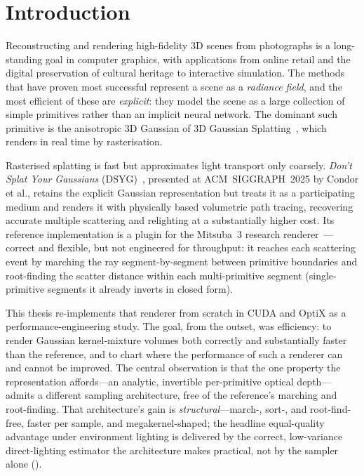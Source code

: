 \chapter{Introduction}

Reconstructing and rendering high-fidelity 3D scenes from photographs is a long-standing goal in
computer graphics, with applications from online retail and the digital preservation of cultural
heritage to interactive simulation. The methods that have proven most successful represent a scene as a
\emph{radiance field}, and the most efficient of these are \emph{explicit}: they model the scene as a
large collection of simple primitives rather than an implicit neural network. The dominant such
primitive is the anisotropic 3D Gaussian of 3D Gaussian Splatting~\cite{3DGS}, which renders in real
time by rasterisation.

Rasterised splatting is fast but approximates light transport only coarsely. \emph{Don't Splat Your
Gaussians} (DSYG)~\cite{DSYG}, presented at ACM~SIGGRAPH~2025 by Condor et al., retains the explicit
Gaussian representation but treats it as a participating medium and renders it with physically based
volumetric path tracing, recovering accurate multiple scattering and relighting at a substantially
higher cost. Its reference implementation is a plugin for the Mitsuba~3 research
renderer~\cite{Mitsuba3}---correct and flexible, but not engineered for throughput: it reaches each
scattering event by marching the ray segment-by-segment between primitive boundaries and root-finding
the scatter distance within each multi-primitive segment (single-primitive segments it already inverts
in closed form).

This thesis re-implements that renderer from scratch in CUDA and OptiX as a performance-engineering
study. The goal, from the outset, was efficiency: to render Gaussian kernel-mixture volumes both
correctly and substantially faster than the reference, and to chart where the performance of such a
renderer can and cannot be improved. The central observation is that the one property the representation
affords---an analytic, invertible per-primitive optical depth---admits a different sampling
architecture, free of the reference's marching and root-finding. That architecture's gain is
\emph{structural}---march-, sort-, and root-find-free, faster per sample, and megakernel-shaped; the
headline equal-quality advantage under environment lighting is delivered by the correct, low-variance
direct-lighting estimator the architecture makes practical, not by the sampler alone ().

